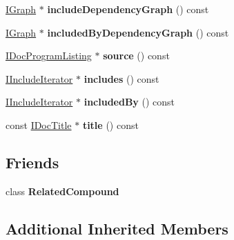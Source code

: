 \begin{DoxyCompactItemize}
\item 
\mbox{\label{class_compound_handler_a80728fc94b27f4f207d824ba50e0a254}} 
\mbox{\hyperlink{class_i_graph}{I\+Graph}} $\ast$ {\bfseries include\+Dependency\+Graph} () const
\item 
\mbox{\label{class_compound_handler_a6b5422384dbf9fa7a97e276bc5682f35}} 
\mbox{\hyperlink{class_i_graph}{I\+Graph}} $\ast$ {\bfseries included\+By\+Dependency\+Graph} () const
\item 
\mbox{\label{class_compound_handler_adb7c8b29add82a478d5aaa12518684f6}} 
\mbox{\hyperlink{class_i_doc_program_listing}{I\+Doc\+Program\+Listing}} $\ast$ {\bfseries source} () const
\item 
\mbox{\label{class_compound_handler_ab0a79233e5fc1cb8d38270c473b0735d}} 
\mbox{\hyperlink{class_i_include_iterator}{I\+Include\+Iterator}} $\ast$ {\bfseries includes} () const
\item 
\mbox{\label{class_compound_handler_a5a7ae882ad9272f8b79176f6ce53a80c}} 
\mbox{\hyperlink{class_i_include_iterator}{I\+Include\+Iterator}} $\ast$ {\bfseries included\+By} () const
\item 
\mbox{\label{class_compound_handler_a0ef06e8be469b6bd2f68e364cf560426}} 
const \mbox{\hyperlink{class_i_doc_title}{I\+Doc\+Title}} $\ast$ {\bfseries title} () const
\end{DoxyCompactItemize}
\subsection*{Friends}
\begin{DoxyCompactItemize}
\item 
\mbox{\label{class_compound_handler_a3ac82494777760c5bf9d85209ba95321}} 
class {\bfseries Related\+Compound}
\end{DoxyCompactItemize}
\subsection*{Additional Inherited Members}


